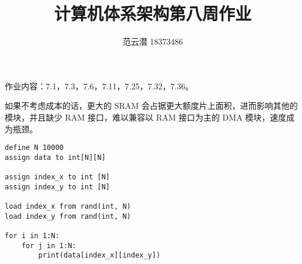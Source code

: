 \documentclass[lang=cn,11pt,a4paper,cite=authoryear,twocolumn]{elegantpaper}
\title{计算机体系架构\quad 第八周作业}
\author{范云潜 18373486}
\institute{微电子学院 184111 班}
\date{\zhtoday}
\begin{document}
\maketitle

作业内容：7.1，7.3，7.6，7.11，7.25，7.32，7.36。


如果不考虑成本的话，更大的 SRAM 会占据更大额度片上面积，进而影响其他的模块，并且缺少 RAM 接口，难以兼容以 RAM 接口为主的 DMA 模块，速度成为瓶颈。


\begin{lstlisting}
define N 10000
assign data to int[N][N]

assign index_x to int [N] 
assign index_y to int [N]

load index_x from rand(int, N)
load index_y from rand(int, N)

for i in 1:N:
    for j in 1:N:
        print(data[index_x][index_y]) 
\end{lstlisting}


\end{document}

